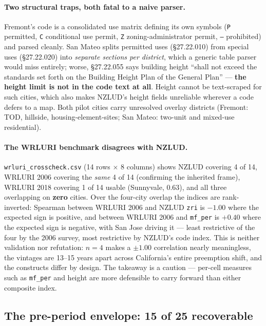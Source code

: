 \documentclass[11pt]{article}
\begin{document}
\paragraph{Two structural traps, both fatal to a naive parser.} Fremont's code is a consolidated
use matrix defining its own symbols (\texttt{P} permitted, \texttt{C} conditional use permit,
\texttt{Z} zoning-administrator permit, \texttt{--} prohibited) and parsed cleanly. San Mateo
splits permitted uses (\S27.22.010) from special uses (\S27.22.020) into \emph{separate sections
per district}, which a generic table parser would miss entirely; worse, \S27.22.055 says building
height ``shall not exceed the standards set forth on the Building Height Plan of the General
Plan'' --- \textbf{the height limit is not in the code text at all}. Height cannot be
text-scraped for such cities, which also makes NZLUD's height fields unreliable wherever a code
defers to a map. Both pilot cities carry unresolved overlay districts (Fremont: TOD, hillside,
housing-element-sites; San Mateo: two-unit and mixed-use residential).

\paragraph{The WRLURI benchmark disagrees with NZLUD.} \texttt{wrluri\_crosscheck.csv} (14 rows
$\times$ 8 columns) shows NZLUD covering 4 of 14, WRLURI 2006 covering the \emph{same} 4 of 14
(confirming the inherited frame), WRLURI 2018 covering 1 of 14 usable (Sunnyvale, 0.63), and all
three overlapping on \textbf{zero} cities. Over the four-city overlap the indices are
rank-inverted: Spearman between WRLURI 2006 and NZLUD \texttt{zri} is $-1.00$ where the expected
sign is positive, and between WRLURI 2006 and \texttt{mf\_per} is $+0.40$ where the expected sign
is negative, with San Jose driving it --- least restrictive of the four by the 2006 survey, most
restrictive by NZLUD's code index. This is neither validation nor refutation: $n=4$ makes a
$\pm 1.00$ correlation nearly meaningless, the vintages are 13--15 years apart across
California's entire preemption shift, and the constructs differ by design. The takeaway is a
caution --- per-cell measures such as \texttt{mf\_per} and height are more defensible to carry
forward than either composite index.

\subsection{The pre-period envelope: 15 of 25 recoverable}
\end{document}

